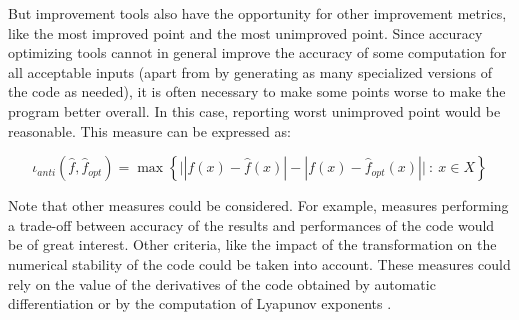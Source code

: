 \documentclass[main.tex]{subfiles}
\begin{document}
But improvement tools also have the opportunity for other improvement
metrics, like the most improved point and the most unimproved
point. Since accuracy optimizing tools cannot in general improve the
accuracy of some computation for all acceptable inputs (apart from by
generating as many specialized versions of the code as needed), it is
often necessary to make some points worse to make the program better
overall. In this case, reporting worst unimproved point would be
reasonable. This measure can be expressed as:

\begin{equation}
\iota_{anti}(\hat{f},\hat{f}_{opt}) = \max \left\{ \big| |f(x)-\hat{f}(x)| - |f(x)-\hat{f}_{opt}(x)|   
\big|\ :\ x\in X\right\}  
\end{equation}

Note that other measures could be considered. For example, measures
performing a trade-off between accuracy of the results and
performances of the code would be of great interest. Other criteria,
like the impact of the transformation on the numerical stability of
the code could be taken into account. These measures could rely on the
value of the derivatives of the code obtained by automatic
differentiation \cite{} or by the computation of Lyapunov exponents
\cite{}.


 
\end{document}
